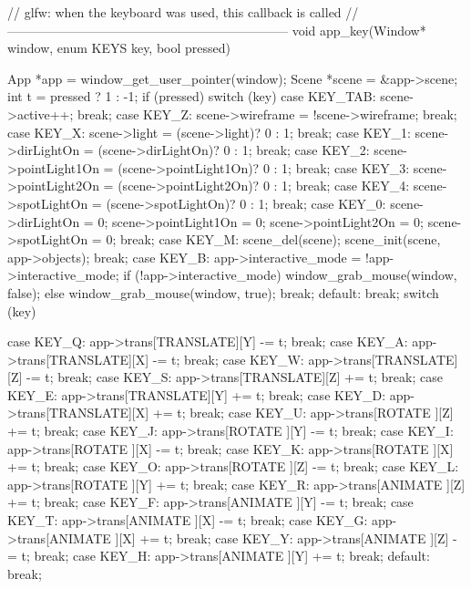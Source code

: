 \begin{multicols}{2}
\begin{ccode}
// glfw: when the keyboard was used, this callback is called
// ------------------------------------------------------------------
void app_key(Window* window, enum KEYS key, bool pressed) {
    App *app = window_get_user_pointer(window);
    Scene *scene = &app->scene;
    int t = pressed ? 1 : -1;
    if (pressed) {
        switch (key) {
        case KEY_TAB:
            scene->active++;
            break;
        case KEY_Z:
            scene->wireframe = !scene->wireframe;
            break;
        case KEY_X:
            scene->light = (scene->light)? 0 : 1;
            break;
        case KEY_1:
            scene->dirLightOn = (scene->dirLightOn)? 0 : 1;
            break;
        case KEY_2:
            scene->pointLight1On = (scene->pointLight1On)? 0 : 1;
            break;
        case KEY_3:
            scene->pointLight2On = (scene->pointLight2On)? 0 : 1;
            break;
        case KEY_4:
            scene->spotLightOn = (scene->spotLightOn)? 0 : 1;
            break;
        case KEY_0:
            scene->dirLightOn = 0;
            scene->pointLight1On = 0;
            scene->pointLight2On = 0;
            scene->spotLightOn = 0;
            break;
        case KEY_M:
            scene_del(scene);
            scene_init(scene, app->objects);
            break;
        case KEY_B:
        {
            app->interactive_mode = !app->interactive_mode;
            if (!app->interactive_mode)
                window_grab_mouse(window, false);
            else
                window_grab_mouse(window, true);
        }
            break;
        default:
            break;
        }
    }
    switch (key) {
    case KEY_Q: app->trans[TRANSLATE][Y] -= t; break;
    case KEY_A: app->trans[TRANSLATE][X] -= t; break;
    case KEY_W: app->trans[TRANSLATE][Z] -= t; break;
    case KEY_S: app->trans[TRANSLATE][Z] += t; break;
    case KEY_E: app->trans[TRANSLATE][Y] += t; break;
    case KEY_D: app->trans[TRANSLATE][X] += t; break;
    case KEY_U: app->trans[ROTATE   ][Z] += t; break;
    case KEY_J: app->trans[ROTATE   ][Y] -= t; break;
    case KEY_I: app->trans[ROTATE   ][X] -= t; break;
    case KEY_K: app->trans[ROTATE   ][X] += t; break;
    case KEY_O: app->trans[ROTATE   ][Z] -= t; break;
    case KEY_L: app->trans[ROTATE   ][Y] += t; break;
    case KEY_R: app->trans[ANIMATE  ][Z] += t; break;
    case KEY_F: app->trans[ANIMATE  ][Y] -= t; break;
    case KEY_T: app->trans[ANIMATE  ][X] -= t; break;
    case KEY_G: app->trans[ANIMATE  ][X] += t; break;
    case KEY_Y: app->trans[ANIMATE  ][Z] -= t; break;
    case KEY_H: app->trans[ANIMATE  ][Y] += t; break;
    default:
        break;

}}
\end{ccode}
\end{multicols}
